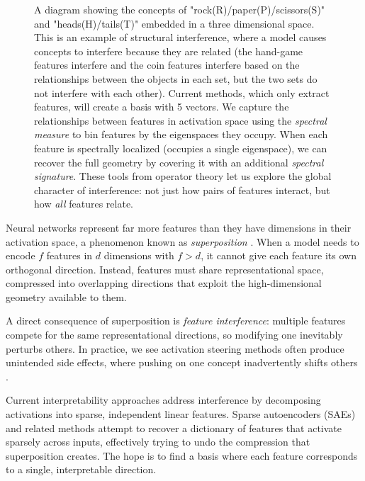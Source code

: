 \documentclass{article}
\theoremstyle{plain}
\numberwithin{equation}{section}
\theoremstyle{definition}
\theoremstyle{remark}
\begin{document}
\begin{figure}
\begin{tikzpicture}
\end{tikzpicture}

\centering
\caption{A diagram showing the concepts of "rock(R)/paper(P)/scissors(S)" and "heads(H)/tails(T)" embedded in a three dimensional space. This is an example of structural interference, where a model causes concepts to interfere because they are related (the hand-game features interfere and the coin features interfere based on the relationships between the objects in each set, but the two sets do not interfere with each other). Current methods, which only extract features, will create a basis with 5 vectors. We capture the relationships between features in activation space using the \textit{spectral measure} to bin features by the eigenspaces they occupy. When each feature is spectrally localized (occupies a single eigenspace), we can recover the full geometry by covering it with an additional \textit{spectral signature}. These tools from operator theory let us explore the global character of interference: not just how pairs of features interact, but how \textit{all} features relate.}
\label{fig:rps-ht}

\end{figure}

Neural networks represent far more features than they have dimensions in their activation space, a phenomenon known as \textit{superposition} \citep{toymodels, superposition_chan}. When a model needs to encode $f$ features in $d$ dimensions with $f > d$, it cannot give each feature its own orthogonal direction. Instead, features must share representational space, compressed into overlapping directions that exploit the high-dimensional geometry available to them.

A direct consequence of superposition is \textit{feature interference}: multiple features compete for the same representational directions, so modifying one inevitably perturbs others. In practice, we see activation steering methods \citep{steering_base_1, steering_base_2, steering_base_3} often produce unintended side effects, where pushing on one concept inadvertently shifts others \citep{bad_steering_1, bad_steering_2, bad_steering_3}.

Current interpretability approaches address interference by decomposing activations into sparse, independent linear features. Sparse autoencoders (SAEs) and related methods attempt to recover a dictionary of features that activate sparsely across inputs, effectively trying to undo the compression that superposition creates. The hope is to find a basis where each feature corresponds to a single, interpretable direction.
\end{document}
